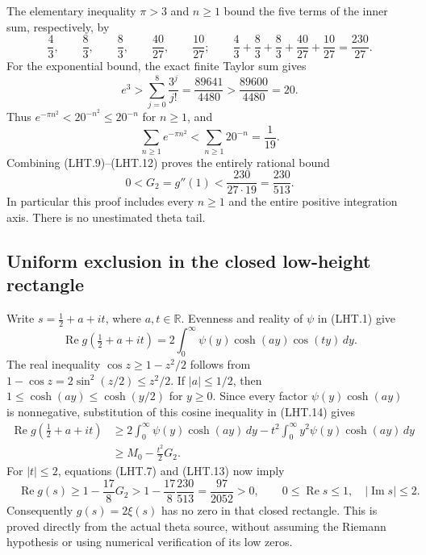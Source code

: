 The elementary inequality $\pi>3$ and $n\geq1$ bound the five
terms of the inner sum, respectively, by
\[
 \frac43,\qquad \frac83,\qquad \frac83,
 \qquad \frac{40}{27},\qquad \frac{10}{27};
 \qquad
 \frac43+\frac83+\frac83+\frac{40}{27}+\frac{10}{27}
       =\frac{230}{27}.
\tag{LHT.10}
\]
For the exponential bound, the exact finite Taylor sum gives
\[
 e^3>\sum_{j=0}^{8}\frac{3^j}{j!}
      =\frac{89641}{4480}>\frac{89600}{4480}=20.
\tag{LHT.11}
\]
Thus $e^{-\pi n^2}<20^{-n^2}\leq20^{-n}$ for $n\geq1$, and
\[
 \sum_{n\geq1}e^{-\pi n^2}<
 \sum_{n\geq1}20^{-n}=\frac1{19}.
 \tag{LHT.12}
\]
Combining (LHT.9)--(LHT.12) proves the entirely rational bound
\[
 0<G_2=g''(1)<\frac{230}{27\cdot19}
                  =\frac{230}{513}.
\tag{LHT.13}
\]
In particular this proof includes every $n\geq1$ and the entire
positive integration axis.  There is no unestimated theta tail.

\subsection{Uniform exclusion in the closed low-height rectangle}

Write $s=\frac12+a+it$, where $a,t\in\mathbb{R}$.
Evenness and reality of $\psi$ in (LHT.1) give
\[
 \operatorname{Re}g(\tfrac12+a+it)
 =2\int_0^\infty\psi(y)\cosh(ay)\cos(ty)\,dy.
\tag{LHT.14}
\]
The real inequality $\cos z\geq1-z^2/2$ follows from
$1-\cos z=2\sin^2(z/2)\leq z^2/2$.  If $|a|\leq1/2$, then
$1\leq\cosh(ay)\leq\cosh(y/2)$ for $y\geq0$.
Since every factor $\psi(y)\cosh(ay)$ is nonnegative, substitution
of this cosine inequality in (LHT.14) gives
\[
 \begin{split}
 \operatorname{Re}g(\tfrac12+a+it)
 &\geq 2\int_0^\infty\psi(y)\cosh(ay)\,dy
       -t^2\int_0^\infty y^2\psi(y)\cosh(ay)\,dy\\
 &\geq M_0-\frac{t^2}{2}G_2.
 \end{split}
\tag{LHT.15}
\]
For $|t|\leq2$, equations (LHT.7) and (LHT.13) now imply
\[
 \boxed{\quad
 \operatorname{Re}g(s)
 \geq1-\frac{17}{8}G_2
 >1-\frac{17}{8}\frac{230}{513}
 =\frac{97}{2052}>0,
 \qquad 0\leq\operatorname{Re}s\leq1,
 \quad |\operatorname{Im}s|\leq2.
 \quad}
\tag{LHT.16}
\]
Consequently $g(s)=2\xi(s)$ has no zero in that closed rectangle.
This is proved directly from the actual theta source, without
assuming the Riemann hypothesis or using numerical verification
of its low zeros.

